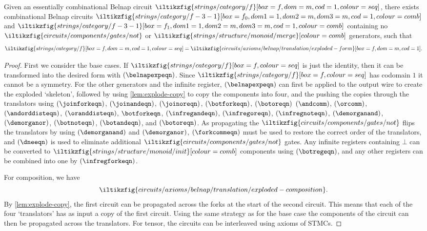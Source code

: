 \begin{proposition}\label{prop:exploded-belnap}
    Given an essentially combinational Belnap circuit \(
    \iltikzfig{strings/category/f}[box=f,dom=m,cod=1,colour=seq]
    \), there exists combinational Belnap circuits \(
    \iltikzfig{strings/category/f-3-1}[box=f_0,dom1=1,dom2=m,dom3=m,cod=1,colour=comb]
    \) and \(
    \iltikzfig{strings/category/f-3-1}[box=f_1,dom1=1,dom2=m,dom3=m,cod=1,colour=comb]
    \) containing no \(
    \iltikzfig{circuits/components/gates/not}
    \) or \(
    \iltikzfig{strings/structure/monoid/merge}[colour=comb]
    \) generators, such that \[
        \iltikzfig{strings/category/f}[box=f,dom=m,cod=1,colour=seq]
        =
        \iltikzfig{circuits/axioms/belnap/translation/exploded-form}[box=f,dom=m,cod=1].
    \]
\end{proposition}
\begin{proof}
    First we consider the base cases.
    If \(
    \iltikzfig{strings/category/f}[box=f,colour=seq]
    \) is just the identity, then it can be transformed into the desired form
    with
    \((\belnapexpeqn)\).
    Since \(\iltikzfig{strings/category/f}[box=f,colour=seq]\) has codomain
    \(1\) it cannot be a symmetry.
    For the other generators and the infinite register,
    \((\belnapexpeqn)\) can first be applied to the output wire to create the
    exploded `skeleton', followed by using \cref{lem:explode-copy} to copy the
    components into four, and the pushing the copies through the translators
    using \((\joinforkeqn)\), \((\joinandeqn)\), \((\joinoreqn)\),
    \((\botforkeqn)\), \((\botoreqn)\) \((\andcomm)\), \((\orcomm)\),
    \((\andorddisteqn)\), \((\oranddisteqn)\), \(\botforkeqn\), \((\infregandeqn)\),
    \((\infregoreqn)\), \((\infregnoteqn)\), \((\demorganand)\),
    \((\demorganor)\), \((\botnoteqn)\), \((\botandeqn)\), and \((\botoreqn)\).
    As propagating the \(
    \iltikzfig{circuits/components/gates/not}
    \) flips the translators by using \((\demorganand)\) and \((\demorganor)\),
    \((\forkcommeqn)\) must be used to restore the correct order of the
    translators, and \((\dneeqn)\) is used to eliminate additional
    \(\iltikzfig{circuits/components/gates/not}\) gates.
    Any infinite registers containing \(\bot\) can be converted to
    \(\iltikzfig{strings/structure/monoid/init}[colour=comb]\) components using
    \((\botregeqn)\), and any other registers can be combined into one by
    \((\infregforkeqn)\).

    For composition, we have \[
        \iltikzfig{circuits/axioms/belnap/translation/exploded-composition}.
    \]
    By \cref{lem:explode-copy}, the first circuit can be propagated across
    the forks at the start of the second circuit.
    This means that each of the four `translators' has as input a copy of the
    first circuit.
    Using the same strategy as for the base case the components of the circuit
    can then be propagated across the translators.
    For tensor, the circuits can be interleaved using axioms of STMCs.
\end{proof}

